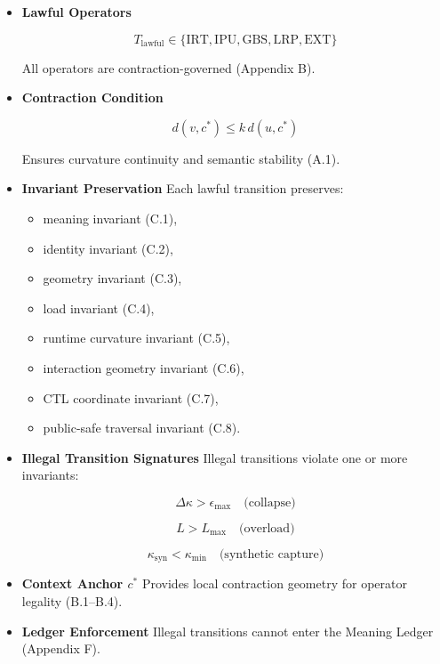 \begin{itemize}
    \item \textbf{Lawful Operators}  
    

\[
    T_{\mathrm{lawful}} \in \{\mathrm{IRT},\mathrm{IPU},\mathrm{GBS},\mathrm{LRP},\mathrm{EXT}\}
    \]


    All operators are contraction-governed (Appendix B).

    \item \textbf{Contraction Condition}  
    

\[
    d(v,c^*) \le k\, d(u,c^*)
    \]


    Ensures curvature continuity and semantic stability (A.1).

    \item \textbf{Invariant Preservation}  
    Each lawful transition preserves:
    \begin{itemize}
        \item meaning invariant (C.1),
        \item identity invariant (C.2),
        \item geometry invariant (C.3),
        \item load invariant (C.4),
        \item runtime curvature invariant (C.5),
        \item interaction geometry invariant (C.6),
        \item CTL coordinate invariant (C.7),
        \item public-safe traversal invariant (C.8).
    \end{itemize}

    \item \textbf{Illegal Transition Signatures}  
    Illegal transitions violate one or more invariants:
    

\[
    \Delta\kappa > \epsilon_{\max}
    \quad\text{(collapse)}
    \]


    

\[
    L > L_{\max}
    \quad\text{(overload)}
    \]


    

\[
    \kappa_{\mathrm{syn}} < \kappa_{\min}
    \quad\text{(synthetic capture)}
    \]



    \item \textbf{Context Anchor $c^*$}  
    Provides local contraction geometry for operator legality (B.1–B.4).

    \item \textbf{Ledger Enforcement}  
    Illegal transitions cannot enter the Meaning Ledger (Appendix F).
\end{itemize}

